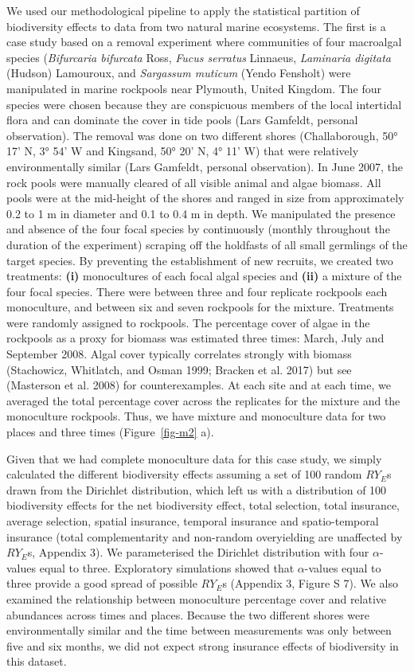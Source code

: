 \documentclass[
  letterpaper,
  DIV=11,
  numbers=noendperiod]{scrartcl}
\begin{document}
We used our methodological pipeline to apply the statistical partition
of biodiversity effects to data from two natural marine ecosystems. The
first is a case study based on a removal experiment where communities of
four macroalgal species (\emph{Bifurcaria bifurcata} Ross, \emph{Fucus
serratus} Linnaeus, \emph{Laminaria digitata} (Hudson) Lamouroux, and
\emph{Sargassum muticum} (Yendo Fensholt) were manipulated in marine
rockpools near Plymouth, United Kingdom. The four species were chosen
because they are conspicuous members of the local intertidal flora and
can dominate the cover in tide pools (Lars Gamfeldt, personal
observation). The removal was done on two different shores
(Challaborough, 50° 17' N, 3° 54' W and Kingsand, 50° 20' N, 4° 11' W)
that were relatively environmentally similar (Lars Gamfeldt, personal
observation). In June 2007, the rock pools were manually cleared of all
visible animal and algae biomass. All pools were at the mid-height of
the shores and ranged in size from approximately 0.2 to 1 m in diameter
and 0.1 to 0.4 m in depth. We manipulated the presence and absence of
the four focal species by continuously (monthly throughout the duration
of the experiment) scraping off the holdfasts of all small germlings of
the target species. By preventing the establishment of new recruits, we
created two treatments: \textbf{(i)} monocultures of each focal algal
species and \textbf{(ii)} a mixture of the four focal species. There
were between three and four replicate rockpools each monoculture, and
between six and seven rockpools for the mixture. Treatments were
randomly assigned to rockpools. The percentage cover of algae in the
rockpools as a proxy for biomass was estimated three times: March, July
and September 2008. Algal cover typically correlates strongly with
biomass (Stachowicz, Whitlatch, and Osman 1999; Bracken et al. 2017) but
see (Masterson et al. 2008) for counterexamples. At each site and at
each time, we averaged the total percentage cover across the replicates
for the mixture and the monoculture rockpools. Thus, we have mixture and
monoculture data for two places and three times (Figure~\ref{fig-m2} a).

Given that we had complete monoculture data for this case study, we
simply calculated the different biodiversity effects assuming a set of
100 random \(RY_{E}\)s drawn from the Dirichlet distribution, which left
us with a distribution of 100 biodiversity effects for the net
biodiversity effect, total selection, total insurance, average
selection, spatial insurance, temporal insurance and spatio-temporal
insurance (total complementarity and non-random overyielding are
unaffected by \(RY_{E}\)s, Appendix 3). We parameterised the Dirichlet
distribution with four \(\alpha\)-values equal to three. Exploratory
simulations showed that \(\alpha\)-values equal to three provide a good
spread of possible \(RY_{E}\)s (Appendix 3, Figure S 7). We also
examined the relationship between monoculture percentage cover and
relative abundances across times and places. Because the two different
shores were environmentally similar and the time between measurements
was only between five and six months, we did not expect strong insurance
effects of biodiversity in this dataset.
\end{document}
